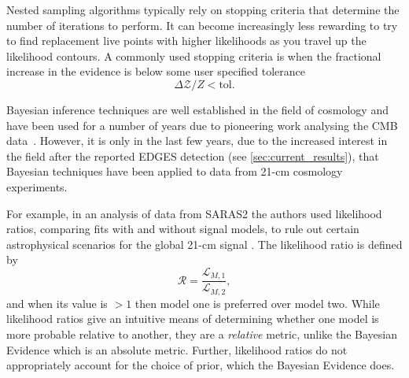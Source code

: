 
Nested sampling algorithms typically rely on stopping criteria that determine the number of iterations to perform. It can become increasingly less rewarding to try to find replacement live points with higher likelihoods as you travel up the likelihood contours. A commonly used stopping criteria is when the fractional increase in the evidence is below some user specified tolerance
\begin{equation}
    \Delta \mathcal{Z}/Z < \mathrm{tol}.
\end{equation}

Bayesian inference techniques are well established in the field of cosmology and have been used for a number of years due to pioneering work analysing the CMB data~\cite{Trotta_bayes_2008}. However, it is only in the last few years, due to the increased interest in the field after the reported EDGES detection (see \cref{sec:current_results}), that Bayesian techniques have been applied to data from 21-cm cosmology experiments. 

For example, in an analysis of data from SARAS2 the authors used likelihood ratios, comparing fits with and without signal models, to rule out certain astrophysical scenarios for the global 21-cm signal \cite{Singh_saras2_2017}. The likelihood ratio is defined by
\begin{equation}
    \mathcal{R} = \frac{\mathcal{L}_{M, 1}}{\mathcal{L}_{M, 2}},
\end{equation}
and when its value is $> 1$ then model one is preferred over model two. While likelihood ratios give an intuitive means of determining whether one model is more probable relative to another, they are a \textit{relative} metric, unlike the Bayesian Evidence which is an absolute metric. Further, likelihood ratios do not appropriately account for the choice of prior, which the Bayesian Evidence does.

